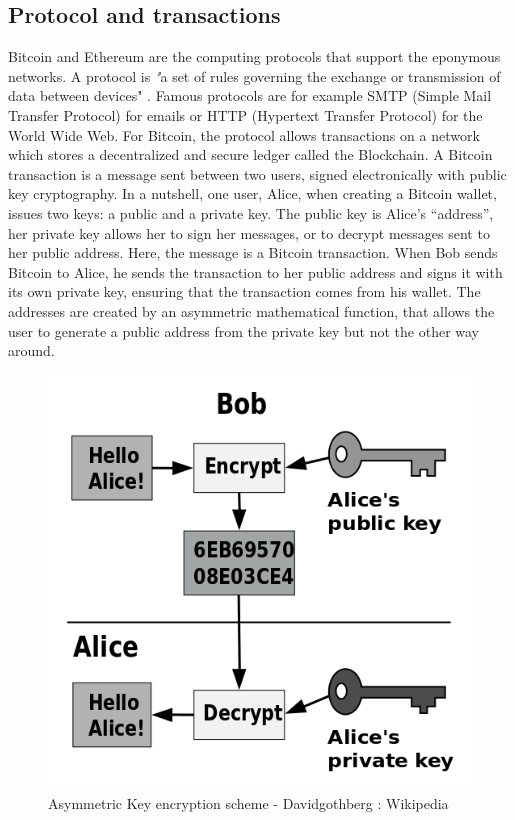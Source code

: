 \documentclass[11pt]{report}
\begin{document}
	\subsection*{Protocol and transactions}
Bitcoin and Ethereum are the computing protocols that support the eponymous networks. A protocol is \textit"{a set of rules governing the exchange or transmission of data between devices}" \cite{OXFORD}. Famous protocols are for example SMTP (Simple Mail Transfer Protocol) for emails or HTTP (Hypertext Transfer Protocol) for the World Wide Web. For Bitcoin, the protocol allows transactions on a network which stores a decentralized and secure ledger called the Blockchain.\medbreak
A Bitcoin transaction is a message sent between two users, signed electronically with public key cryptography. In a nutshell, one user, Alice, when creating a Bitcoin wallet, issues two keys: a public and a private key. The public key is Alice’s “address”, her private key allows her to sign her messages, or to decrypt messages sent to her public address. Here, the message is a Bitcoin transaction. \newline When Bob sends Bitcoin to Alice, he sends the transaction to her public address and signs it with its own private key, ensuring that the transaction comes from his wallet. The addresses are created by an asymmetric mathematical function, that allows the user to generate a public address from the private key but not the other way around. \medbreak

\begin{figure}[!h]
\centering
\includegraphics[scale=0.3]{Chap1/Cle}\medbreak
\caption{Asymmetric Key encryption scheme - Davidgothberg : Wikipedia}
\label{KEY}
\end{figure}
\end{document}
